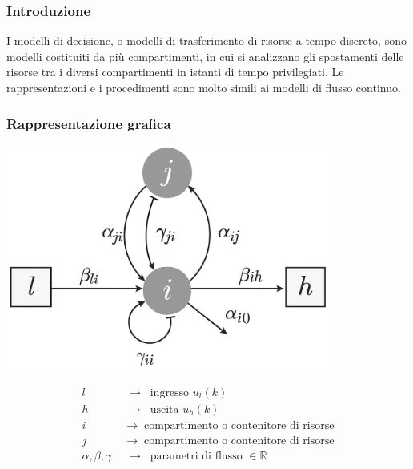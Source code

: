 \subsubsection*{Introduzione}
I modelli di decisione, o modelli di trasferimento di risorse a tempo discreto, sono modelli costituiti da più compartimenti,
in cui si analizzano gli spostamenti delle risorse tra i diversi compartimenti in istanti di tempo privilegiati. Le rappresentazioni
e i procedimenti sono molto simili ai modelli di flusso continuo.

\subsubsection*{Rappresentazione grafica}
\begin{center}
	\begin{minipage}{0.4\textwidth}
		\centering
		\includegraphics[width=0.8\textwidth]{modelli/modello flusso continuo.png}
	\end{minipage}
	\begin{minipage}{0.5\textwidth}
		\begin{align*}
			l \;\; &\rightarrow \;\; \text{ingresso } u_l(k) \\
			h \;\; &\rightarrow \;\; \text{uscita } u_h(k) \\
			i \;\; &\rightarrow \;\; \text{compartimento o contenitore di risorse} \\
			j \;\; &\rightarrow \;\; \text{compartimento o contenitore di risorse} \\
			\alpha, \beta, \gamma \;\; &\rightarrow \;\; \text{parametri di flusso } \in \mathbb{R} 
		\end{align*}
	\end{minipage}

\end{center}
